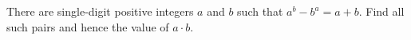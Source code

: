 There are single-digit positive integers $a$ and $b$ such that $a^b-b^a=a+b$. Find all such pairs and hence the value of $a\cdot b$.
